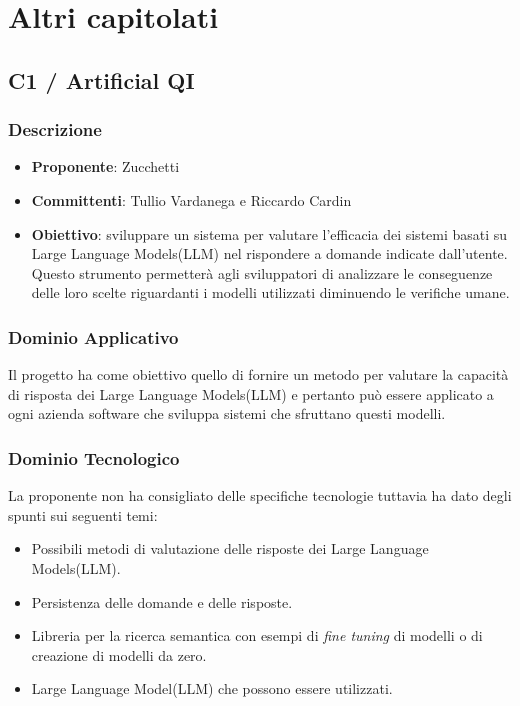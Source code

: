 \documentclass[a4paper, 12pt]{article}
\begin{document}
\section{Altri capitolati}
\subsection{C1 / Artificial QI}
\subsubsection{Descrizione}
\begin{itemize}
    \item \textbf{Proponente}: Zucchetti
    \item \textbf{Committenti}: Tullio Vardanega e Riccardo Cardin
    \item \textbf{Obiettivo}: sviluppare un sistema per valutare l'efficacia dei sistemi basati su Large Language Models(LLM) nel rispondere a domande indicate dall’utente. 
    Questo strumento permetterà agli sviluppatori di analizzare le conseguenze delle loro scelte riguardanti i modelli utilizzati diminuendo le verifiche umane.     
\end{itemize}

\subsubsection{Dominio Applicativo}
Il progetto ha come obiettivo quello di fornire un metodo per valutare la capacità di risposta dei Large Language Models(LLM) e pertanto può essere applicato a ogni azienda software che sviluppa sistemi che sfruttano questi modelli.

\subsubsection{Dominio Tecnologico}
La proponente non ha consigliato delle specifiche tecnologie tuttavia ha dato degli spunti sui seguenti temi:
\begin{itemize}
    \item Possibili metodi di valutazione delle risposte dei Large Language Models(LLM).
    \item Persistenza delle domande e delle risposte.
    \item Libreria per la ricerca semantica con esempi di \textit{fine tuning} di modelli o di creazione di modelli da zero.
    \item Large Language Model(LLM) che possono essere utilizzati.
\end{itemize}
\end{document}
